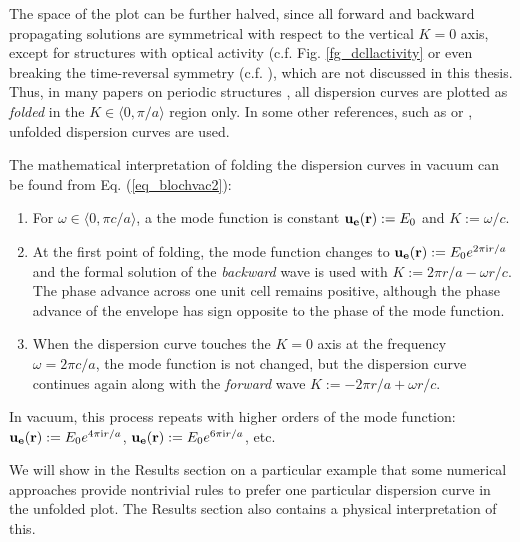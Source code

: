The space of the plot can be further halved, since all forward and backward propagating solutions are symmetrical with respect to the vertical $K=0$ axis, except for structures with optical activity (c.f. Fig. \ref{fg_dcllactivity} or even breaking the time-reversal symmetry (c.f. \cite{vanwolleghem2009unidirectional}), which are not discussed in this thesis. Thus, in many papers on periodic structures \cite{obrien2002photonic,yannopapas2005negative}, all dispersion curves are plotted as \textit{folded} in the $K\in\langle0, \pi/a\rangle$ region only. In some other references, such as \cite{mortensen2010unambiguous} or \cite{yeh1977electromagnetic}, unfolded dispersion curves are used.

The mathematical interpretation of folding the dispersion curves in vacuum can be found from Eq. (\ref{eq_blochvac2}): 
\begin{enumerate}
\item{
For  $\omega\in\langle 0, \pi c /a\rangle$, a the mode function is constant $\mathbf{u_e}({\mathbf{r}}) := E_0$ and $K := \omega/c$. 
} 
\item{
At the first point of folding, the mode function changes to $\mathbf{u_e}({\mathbf{r}}) := E_0 e^{2\pi{\mathrm i} r/a}$ and the formal solution of the \textit{backward} wave is used with $K := 2\pi r/a - \omega r/c$.  The phase advance across one unit cell remains positive, although the phase advance of the envelope has sign opposite to the phase of the mode function.
} 
\item{
When the dispersion curve touches the $K=0$ axis at the frequency $\omega = 2\pi c/a$, the mode function is not changed, but the dispersion curve continues again along with the \textit{forward} wave $K := - 2\pi r/a + \omega r/c$.
} 
 \end{enumerate}
In vacuum, this process repeats with higher orders of the mode function: $\mathbf{u_e}({\mathbf{r}}) := E_0 e^{4\pi{\mathrm i} r/a}$, $\mathbf{u_e}({\mathbf{r}}) := E_0 e^{6\pi{\mathrm i} r/a}$, etc.

We will show in the Results section on a particular example that some numerical approaches provide nontrivial rules to prefer one particular dispersion curve in the unfolded plot. The Results section also contains a physical interpretation of this.

